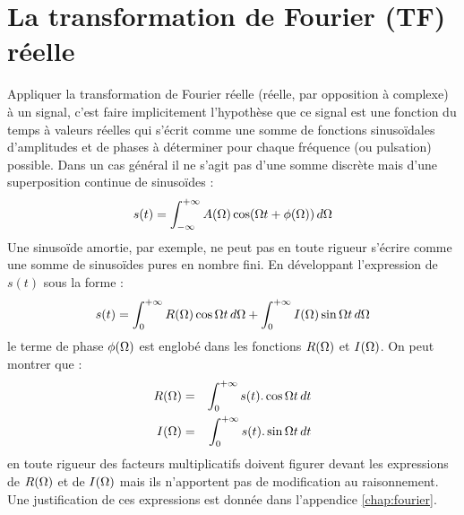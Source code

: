 \section{La transformation de Fourier (TF) réelle}
Appliquer la transformation de Fourier réelle (réelle, par opposition à complexe) à un 
signal, c'est faire implicitement l'hypothèse que ce signal est une fonction du temps à 
valeurs réelles qui s'écrit comme une somme de fonctions sinusoïdales d'amplitudes et de 
phases à déterminer pour chaque fréquence (ou pulsation) possible. 
Dans un cas général il ne s'agit pas d'une somme 
discrète mais d'une superposition continue de sinusoïdes :
\begin{equation}
s(t) = \int_{-\infty}^{+\infty} A(\Omega) \cos(\Omega t + \phi(\Omega)) \, d\Omega
\end{equation}
Une sinusoïde amortie, par exemple, ne peut pas en toute rigueur s'écrire comme une 
somme de sinusoïdes pures en nombre fini. 
En développant l'expression de $s(t)$ sous la 
forme :
\begin{equation}
s(t) = \int_0^{+\infty} R(\Omega) \cos\Omega t \, d\Omega + \int_0^{+\infty} I(\Omega) \sin\Omega t \, d\Omega
\end{equation}
le terme de phase $\phi(\Omega)$ est englobé dans les fonctions $R(\Omega)$ et $I(\Omega)$. 
On peut montrer que : 
\begin{eqnarray}
\label{eqn:ftftr}
R(\Omega) & = & \int_0^{+\infty} s(t).\cos \Omega t \, dt \\
\label{eqn:ftfti}
I(\Omega) & = & \int_0^{+\infty} s(t).\sin \Omega t \, dt
\end{eqnarray}
en toute rigueur des facteurs multiplicatifs doivent figurer devant les expressions de 
$R(\Omega)$ et de $I(\Omega)$ mais ils n'apportent pas de modification au raisonnement. 
Une justification de ces expressions est donnée dans l'appendice \ref{chap:fourier}.

